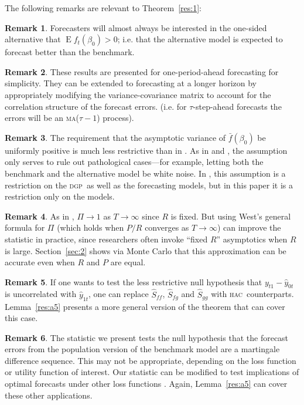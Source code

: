 \documentclass[12pt]{article}
\theoremstyle{definition}
\newtheorem{rem}{Remark}
\DeclareMathOperator{\E}{E}
\newcommand{\dgp}{\textsc{dgp}}
\newcommand{\hac}{\textsc{hac}}
\newcommand{\ma}{\textsc{ma}}
\begin{document}
The following remarks are relevant to Theorem~\ref{res:1}:

\begin{rem}
  Forecasters will almost always be interested in the one-sided
  alternative that $\E f_t(\beta_0) > 0$; i.e. that the alternative
  model is expected to forecast better than the benchmark.
\end{rem}

\begin{rem}
  These results are presented for one-period-ahead forecasting for
  simplicity.  They can be extended to forecasting at a longer horizon
  by appropriately modifying the variance-covariance matrix to account
  for the correlation structure of the forecast errors. (i.e. for
  $\tau$-step-ahead forecasts the errors will be an \ma($\tau-1$) process).
\end{rem}

\begin{rem}
  The requirement that the asymptotic variance of $\bar f(\beta_0)$ be
  uniformly positive is much less restrictive than in \cite{Wes:96}.
  As in \cite{GiW:06} and \citet{ClW:06,ClW:07}, the assumption only
  serves to rule out pathological cases---for example, letting both
  the benchmark and the alternative model be white noise. In
  \citet{Wes:96}, this assumption is a restriction on the \dgp\ as
  well as the forecasting models, but in this paper it is a
  restriction only on the models.
\end{rem}

\begin{rem}
  As in \citet{Wes:96}, $\Pi \to 1$ as $T \to \infty$ since $R$ is
  fixed.  But using West's general formula for $\Pi$ (which holds when
  $P/R$ converges as $T \to \infty$) can improve the statistic in
  practice, since researchers often invoke ``fixed $R$'' asymptotics
  when $R$ is large.  Section~\ref{sec:2} shows via Monte Carlo that
  this approximation can be accurate even when $R$ and $P$ are equal.
\end{rem}

\begin{rem}
  If one wants to test the less restrictive null hypothesis that
  $y_{t1} - \hat{y}_{0t}$ is uncorrelated with $\hat{y}_{1t}$, one can
  replace $\hat{S}_{ff}$, $\hat{S}_{fg}$ and $\hat{S}_{gg}$ with \hac\
  counterparts.  Lemma~\ref{res:a5} presents a more general version of
  the theorem that can cover this case.
\end{rem}

\begin{rem}
  The statistic we present tests the null hypothesis that the forecast
  errors from the population version of the benchmark model are a
  martingale difference sequence.  This may not be appropriate,
  depending on the loss function or utility function of interest.  Our
  statistic can be modified to test implications of optimal forecasts
  under other loss functions \citep[see][]{PaT:07,PaT:07b}.  Again,
  Lemma~\ref{res:a5} can cover these other applications.
\end{rem}
\end{document}
